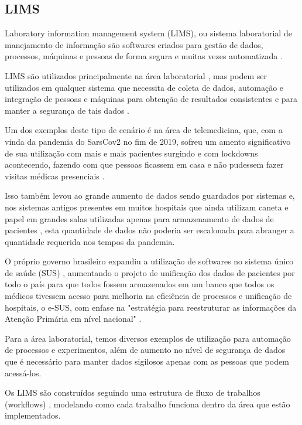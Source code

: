 \subsection{LIMS}


Laboratory information management system (LIMS), ou sistema laboratorial de manejamento de informação são softwares criados para gestão de dados, processos, máquinas e pessoas de forma segura e muitas vezes automatizada \cite{Stafford1998}.


LIMS são utilizados principalmente na área laboratorial \R, mas podem ser utilizados em qualquer sistema que necessita de coleta de dados, automação e integração de pessoas e máquinas para obtenção de resultados consistentes e para manter a segurança de tais dados \R.

Um dos exemplos deste tipo de cenário é na área de telemedicina, que, com a vinda da pandemia do SarsCov2 no fim de 2019, sofreu um amento significativo de sua utilização com mais e mais pacientes surgindo e com lockdowns acontecendo, fazendo com que pessoas ficassem em casa e não pudessem fazer visitas médicas presenciais \R.

Isso também levou ao grande aumento de dados sendo guardados por sistemas e, nos sistemas antigos presentes em muitos hospitais que ainda utilizam caneta e papel em grandes salas utilizadas apenas para armazenamento de dados de pacientes \R, esta quantidade de dados não poderia ser escalonada para abranger a quantidade requerida nos tempos da pandemia.


O próprio governo brasileiro expandiu a utilização de softwares no sistema único de saúde (SUS) \R, aumentando o projeto de unificação dos dados de pacientes por todo o país para que todos fossem armazenados em um banco que todos os médicos tivessem acesso para melhoria na eficiência de processos e unificação de hospitais, o  e-SUS, com enfase na "estratégia para reestruturar as informações da Atenção Primária em nível nacional" \R.

Para a área laboratorial, temos diversos exemplos de utilização para automação de processos e experimentos, além de aumento no nível de segurança de dados que é necessário para manter dados sigilosos apenas com as pessoas que podem acessá-los. \NO

Os LIMS são construídos seguindo uma estrutura de fluxo de trabalhos (workflows) \R, modelando como cada trabalho funciona dentro da área que estão implementados. \NO

